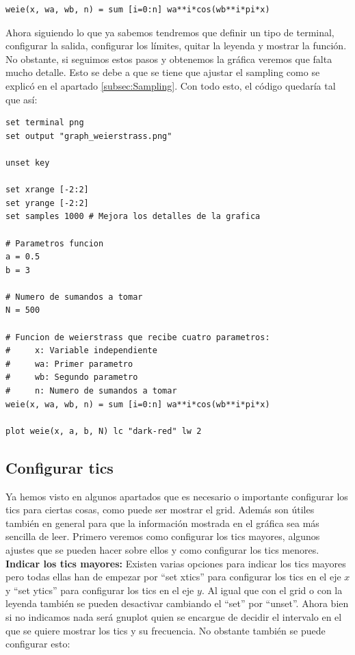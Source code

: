 \documentclass[11pt,a4paper,twoside,pdf]{article}
\numberwithin{equation}{section}
\begin{document}
\begin{lstlisting}[language=Gnuplot]
weie(x, wa, wb, n) = sum [i=0:n] wa**i*cos(wb**i*pi*x)
\end{lstlisting}

Ahora siguiendo lo que ya sabemos tendremos que definir un tipo de terminal, configurar la salida, configurar los límites, quitar la leyenda y mostrar la función. No obstante, si seguimos estos pasos y obtenemos la gráfica veremos que falta mucho detalle. Esto se debe a que se tiene que ajustar el sampling como se explicó en el apartado \ref{subsec:Sampling}. Con todo esto, el código quedaría tal que así:

\begin{lstlisting}[language=Gnuplot]
set terminal png
set output "graph_weierstrass.png"

unset key

set xrange [-2:2]
set yrange [-2:2]
set samples 1000 # Mejora los detalles de la grafica

# Parametros funcion
a = 0.5
b = 3

# Numero de sumandos a tomar
N = 500

# Funcion de weierstrass que recibe cuatro parametros:
#     x: Variable independiente
#     wa: Primer parametro
#     wb: Segundo parametro
#     n: Numero de sumandos a tomar
weie(x, wa, wb, n) = sum [i=0:n] wa**i*cos(wb**i*pi*x)

plot weie(x, a, b, N) lc "dark-red" lw 2
\end{lstlisting}

\subsection{Configurar tics\label{subsec:ConfigurarTics}}

Ya hemos visto en algunos apartados que es necesario o importante configurar los tics para ciertas cosas, como puede ser mostrar el grid. Además son útiles también en general para que la información mostrada en el gráfica sea más sencilla de leer. Primero veremos como configurar los tics mayores, algunos ajustes que se pueden hacer sobre ellos y como configurar los tics menores.\\

\textbf{Indicar los tics mayores:} Existen varias opciones para indicar los tics mayores pero todas ellas han de empezar por ``set xtics'' para configurar los tics en el eje $x$ y ``set ytics'' para configurar los tics en el eje $y$. Al igual que con el grid o con la leyenda también se pueden desactivar cambiando el ``set'' por ``unset''. Ahora bien si no indicamos nada será gnuplot quien se encargue de decidir el intervalo en el que se quiere mostrar los tics y su frecuencia. No obstante también se puede configurar esto:
\end{document}

